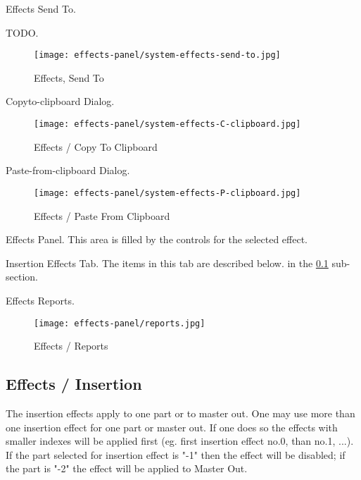       Effects Send To.

      TODO.

\begin{figure}[H]
   \centering 
   \texttt{[image: effects-panel/system-effects-send-to.jpg]}
   \caption{Effects, Send To}
   \label{fig:effects_send_to}
\end{figure}

   Copyto-clipboard Dialog.

\begin{figure}[H]
   \centering 
   \texttt{[image: effects-panel/system-effects-C-clipboard.jpg]}
   \caption{Effects / Copy To Clipboard}
   \label{fig:effects_copy_to_clipboard}
\end{figure}

   Paste-from-clipboard Dialog.

\begin{figure}[H]
   \centering 
   \texttt{[image: effects-panel/system-effects-P-clipboard.jpg]}
   \caption{Effects / Paste From Clipboard}
   \label{fig:effects_paste_from_clipboard}
\end{figure}

   Effects Panel.
   This area is filled by the controls for the selected effect.

   Insertion Effects Tab.
   The items in this tab are described below.
   in the \ref{subsec:effects_insertion}
   sub-section.

   Effects Reports.

\begin{figure}[H]
   \centering 
   \texttt{[image: effects-panel/reports.jpg]}
   \caption{Effects / Reports}
   \label{fig:effects_reports}
\end{figure}

\subsection{Effects / Insertion}
\label{subsec:effects_insertion}

   The insertion effects apply to one part or to master out. One may use more
   than one insertion effect for one part or master out. If one does so the
   effects with smaller indexes will be applied first (eg. first insertion
   effect no.0, than no.1, ...). If the part selected for insertion
   effect is "-1" then the effect will be disabled; if the part is "-2" the
   effect will be applied to Master Out. 

